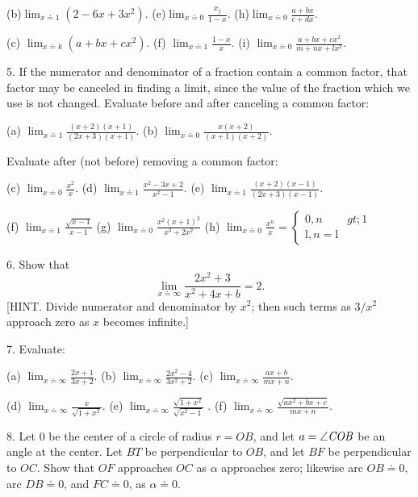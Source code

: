 \documentclass[12pt]{article}
\begin{document}
(b)$\displaystyle \lim_{x \doteq 1}(2-6x+3x^{2})$.
(e)$\displaystyle \lim_{x \doteq0}\frac{x_{j}}{1-x}$.
(h)$\displaystyle \lim_{x \doteq0}\frac{a+bx}{c+dx}$.

(c) $\displaystyle \lim_{x \doteq k}(a+bx+cx^{2})$.
(f) $\displaystyle \lim_{x \doteq 1}\frac{1-x}{x}$. 
(i) $\displaystyle \lim_{x \doteq 0}\frac{a+bx+cx^{2}}{m+nx+lx^{2}}$.

5. If the numerator and denominator of a fraction contain a common
factor, that factor may be canceled in finding a limit, since the value of
the fraction which we use is not changed. Evaluate before and after
canceling a common factor:

(a) $\displaystyle \lim_{x \doteq 1}\frac{(x+2)(x+1)}{(2x+3)(x+1)}$.
(b) $\displaystyle \lim_{x \doteq 0}\frac{x(x+2)}{(x+1)(x+2)}$.

Evaluate after (not before) removing a common factor:

(c) $\displaystyle \lim_{x \doteq 0}\frac{x^{2}}{x}$.
(d) $\displaystyle \lim_{x \doteq 1}\frac{x^{2}-3x+2}{x^{2}-1}$.
(e) $\displaystyle \lim_{x \doteq 1}\frac{(x+2)(x-1)}{(2x+3)(x-1)}$.

(f) $\displaystyle \lim_{x \doteq 1}\frac{\sqrt{x-1}}{x-1}$
(g) $\lim_{x \doteq  0}\frac{x^{2}(x+1)^{2}}{x^{3}+2x^{2}}$
(h) $\displaystyle \lim_{x \doteq  0}\frac{x^{n}}{x}=\left\{\begin{array}{l}
0,n&gt;1\\ \mathrm{l},n=\mathrm{l} \end{array}\right.$

6. Show that
$$
\lim_{x \doteq \infty}\frac{2x^{2}+3}{x^{2}+4x+b}=2.
$$
[HINT. Divide numerator and denominator by $x^{2}$; then such 
terms as $3/x^2$ approach zero as $x$ becomes infinite.]

7. Evaluate:

(a) $\displaystyle \lim_{x \doteq \infty}\frac{2x+1}{3x+2}$.
(b) $\displaystyle \lim_{x \doteq \infty}\frac{2x^{2}-4}{3x^{2}+2}$.
(c) $\displaystyle \lim_{x \doteq \infty}\frac{ax+b}{mx+n}$.

(d) $\displaystyle \lim_{x \doteq \infty}\frac{x}{\sqrt{1+x^{2}}}$.
(e) $\displaystyle \lim_{x \doteq \infty}\frac{\sqrt{1+x^{2}}}{\sqrt{x^{2}-1}}$ .
(f) $\displaystyle \lim_{x \doteq \infty}\frac{\sqrt{ax^2+bx+c}}{mx+n}$.

8. Let $0$ be the center of a circle of radius $r=OB$, and let 
$a=\angle {\it COB}$ be an angle at the center. Let $BT$ be
perpendicular to $OB$, and let $BF$ be perpendicular to
$OC$. Show that $OF$ approaches $OC$ as $\alpha$ 
approaches zero; likewise arc $OB \doteq 0$, arc $DB \doteq 0$,
and $FC \doteq 0$, as $\alpha \doteq 0$.
\end{document}
